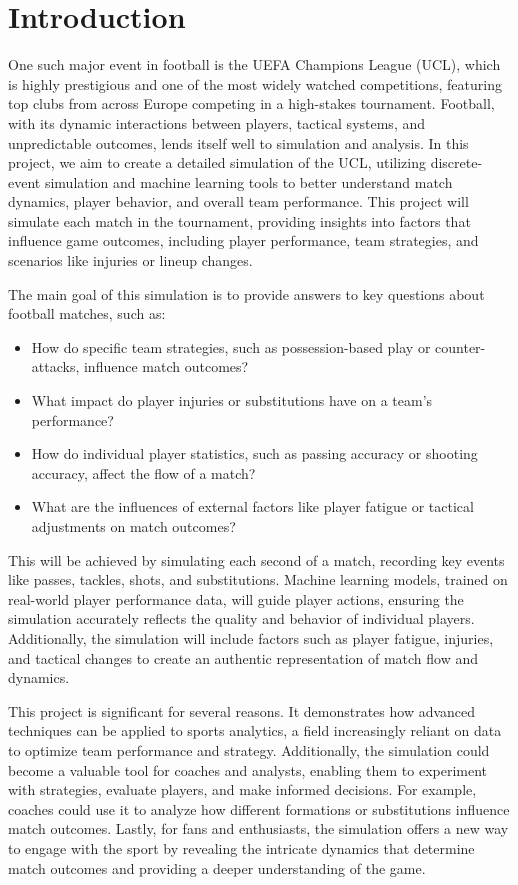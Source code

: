 \documentclass[12pt]{article}
\begin{document}
\section{Introduction}
One such major event in football is the UEFA Champions League (UCL), which is highly prestigious and one of the most widely watched competitions, featuring top clubs from across Europe competing in a high-stakes tournament. Football, with its dynamic interactions between players, tactical systems, and unpredictable outcomes, lends itself well to simulation and analysis. In this project, we aim to create a detailed simulation of the UCL, utilizing discrete-event simulation and machine learning tools to better understand match dynamics, player behavior, and overall team performance. This project will simulate each match in the tournament, providing insights into factors that influence game outcomes, including player performance, team strategies, and scenarios like injuries or lineup changes.

The main goal of this simulation is to provide answers to key questions about football matches, such as:

\begin{itemize}
    \item How do specific team strategies, such as possession-based play or counter-attacks, influence match outcomes?
    \item What impact do player injuries or substitutions have on a team’s performance?
    \item How do individual player statistics, such as passing accuracy or shooting accuracy, affect the flow of a match?
    \item What are the influences of external factors like player fatigue or tactical adjustments on match outcomes?
\end{itemize}

This will be achieved by simulating each second of a match, recording key events like passes, tackles, shots, and substitutions. Machine learning models, trained on real-world player performance data, will guide player actions, ensuring the simulation accurately reflects the quality and behavior of individual players. Additionally, the simulation will include factors such as player fatigue, injuries, and tactical changes to create an authentic representation of match flow and dynamics.

This project is significant for several reasons. It demonstrates how advanced techniques can be applied to sports analytics, a field increasingly reliant on data to optimize team performance and strategy. Additionally, the simulation could become a valuable tool for coaches and analysts, enabling them to experiment with strategies, evaluate players, and make informed decisions. For example, coaches could use it to analyze how different formations or substitutions influence match outcomes. Lastly, for fans and enthusiasts, the simulation offers a new way to engage with the sport by revealing the intricate dynamics that determine match outcomes and providing a deeper understanding of the game.
\end{document}
